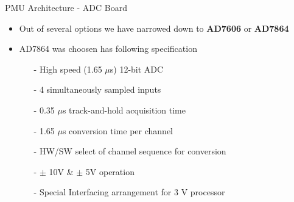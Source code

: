 \documentclass{beamer}
\begin{document}
\begin{frame}{PMU Architecture - ADC Board}

\begin{itemize}
\item Out of several options we have narrowed down to \textbf{AD7606} or \textbf{AD7864}
\item AD7864 was choosen has following specification
\begin{itemize}
	\item[-] High speed (1.65 $\mu$s) 12-bit ADC 
	\item[-] 4 simultaneously sampled inputs
	\item[-] 0.35 $\mu$s track-and-hold acquisition time 
	\item[-] 1.65 $\mu$s conversion time per channel 
	\item[-] HW/SW select of channel sequence for conversion 
	\item[-] $\pm$ 10V \& $\pm$ 5V operation
	\item[-] Special Interfacing arrangement for 3 V processor 
\end{itemize} 
\end{itemize}
\end{frame}
\end{document}
